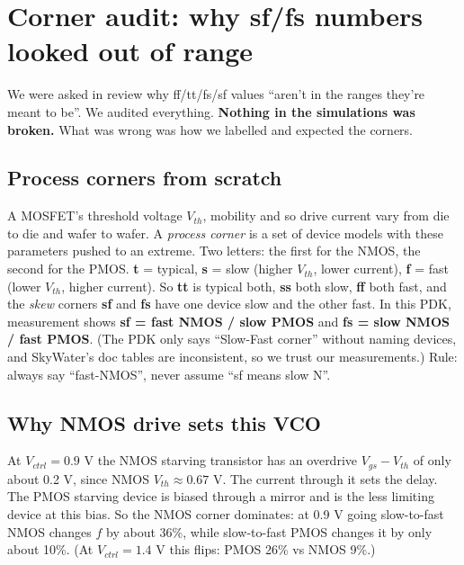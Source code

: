 \documentclass[11pt,a4paper]{article}
\begin{document}
\section{Corner audit: why sf/fs numbers looked out of range}
We were asked in review why ff/tt/fs/sf values ``aren't in the ranges they're meant to be''. We audited everything. \textbf{Nothing in the simulations was broken.} What was wrong was how we labelled and expected the corners.

\subsection{Process corners from scratch}
A MOSFET's threshold voltage $V_{th}$, mobility and so drive current vary from die to die and wafer to wafer. A \emph{process corner} is a set of device models with these parameters pushed to an extreme. Two letters: the first for the NMOS, the second for the PMOS. \textbf{t} = typical, \textbf{s} = slow (higher $V_{th}$, lower current), \textbf{f} = fast (lower $V_{th}$, higher current). So \textbf{tt} is typical both, \textbf{ss} both slow, \textbf{ff} both fast, and the \emph{skew} corners \textbf{sf} and \textbf{fs} have one device slow and the other fast. In this PDK, measurement shows \textbf{sf = fast NMOS / slow PMOS} and \textbf{fs = slow NMOS / fast PMOS}. (The PDK only says ``Slow-Fast corner'' without naming devices, and SkyWater's doc tables are inconsistent, so we trust our measurements.) Rule: always say ``fast-NMOS'', never assume ``sf means slow N''.

\subsection{Why NMOS drive sets this VCO}
At $V_{ctrl}=0.9$ V the NMOS starving transistor has an overdrive $V_{gs}-V_{th}$ of only about 0.2 V, since NMOS $V_{th}\approx0.67$ V. The current through it sets the delay. The PMOS starving device is biased through a mirror and is the less limiting device at this bias. So the NMOS corner dominates: at 0.9 V going slow-to-fast NMOS changes $f$ by about 36\%, while slow-to-fast PMOS changes it by only about 10\%. (At $V_{ctrl}=1.4$ V this flips: PMOS 26\% vs NMOS 9\%.)
\end{document}
